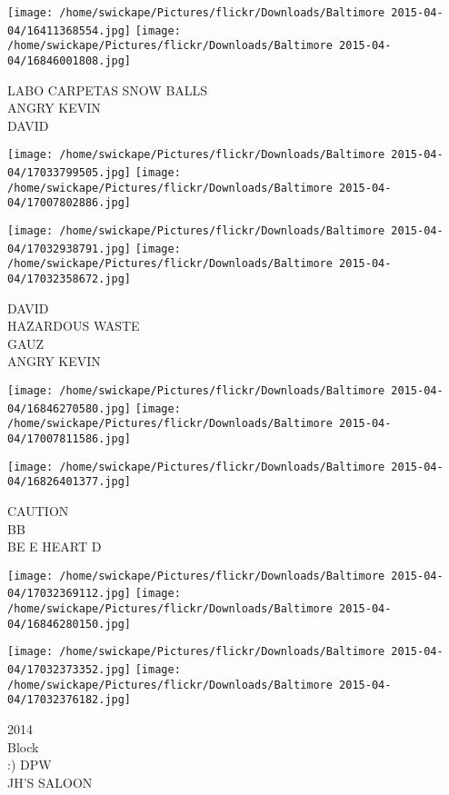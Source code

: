 \documentclass[10pt,letterpaper]{article}
\begin{document}
\vspace{0.25in}
\texttt{[image: /home/swickape/Pictures/flickr/Downloads/Baltimore 2015-04-04/16411368554.jpg]}
\texttt{[image: /home/swickape/Pictures/flickr/Downloads/Baltimore 2015-04-04/16846001808.jpg]}

LABO CARPETAS SNOW BALLS\\
ANGRY KEVIN\\
DAVID\\
\pagebreak

\texttt{[image: /home/swickape/Pictures/flickr/Downloads/Baltimore 2015-04-04/17033799505.jpg]}
\texttt{[image: /home/swickape/Pictures/flickr/Downloads/Baltimore 2015-04-04/17007802886.jpg]}

\texttt{[image: /home/swickape/Pictures/flickr/Downloads/Baltimore 2015-04-04/17032938791.jpg]}
\texttt{[image: /home/swickape/Pictures/flickr/Downloads/Baltimore 2015-04-04/17032358672.jpg]}

DAVID\\
HAZARDOUS WASTE\\
GAUZ\\
ANGRY KEVIN\\
\pagebreak

\texttt{[image: /home/swickape/Pictures/flickr/Downloads/Baltimore 2015-04-04/16846270580.jpg]}
\texttt{[image: /home/swickape/Pictures/flickr/Downloads/Baltimore 2015-04-04/17007811586.jpg]}

\vspace{0.25in}
\texttt{[image: /home/swickape/Pictures/flickr/Downloads/Baltimore 2015-04-04/16826401377.jpg]}

CAUTION\\
BB\\
BE E HEART D\\
\pagebreak

\texttt{[image: /home/swickape/Pictures/flickr/Downloads/Baltimore 2015-04-04/17032369112.jpg]}
\texttt{[image: /home/swickape/Pictures/flickr/Downloads/Baltimore 2015-04-04/16846280150.jpg]}

\texttt{[image: /home/swickape/Pictures/flickr/Downloads/Baltimore 2015-04-04/17032373352.jpg]}
\texttt{[image: /home/swickape/Pictures/flickr/Downloads/Baltimore 2015-04-04/17032376182.jpg]}

2014\\
Block\\
:) DPW\\
JH'S SALOON\\
\pagebreak
\end{document}
